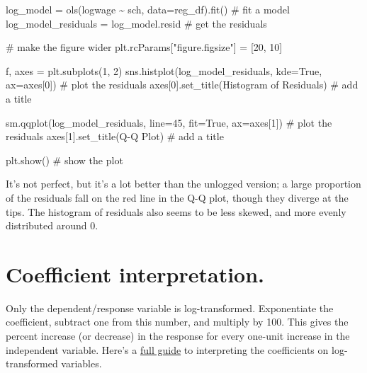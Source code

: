 \documentclass[
  letterpaper,
  DIV=11,
  numbers=noendperiod]{scrreprt}
\newenvironment{Shaded}{\begin{snugshade}}{\end{snugshade}}
\newcommand{\CommentTok}[1]{\textcolor[rgb]{0.37,0.37,0.37}{#1}}
\newcommand{\DecValTok}[1]{\textcolor[rgb]{0.68,0.00,0.00}{#1}}
\newcommand{\NormalTok}[1]{\textcolor[rgb]{0.00,0.23,0.31}{#1}}
\newcommand{\OperatorTok}[1]{\textcolor[rgb]{0.37,0.37,0.37}{#1}}
\newcommand{\StringTok}[1]{\textcolor[rgb]{0.13,0.47,0.30}{#1}}
\newcommand{\VariableTok}[1]{\textcolor[rgb]{0.07,0.07,0.07}{#1}}
\begin{document}
\begin{Shaded}
\begin{Highlighting}[]
\NormalTok{log\_model }\OperatorTok{=}\NormalTok{ ols(}\StringTok{\textquotesingle{}logwage \textasciitilde{}  sch\textquotesingle{}}\NormalTok{, data}\OperatorTok{=}\NormalTok{reg\_df).fit()  }\CommentTok{\# fit a model}
\NormalTok{log\_model\_residuals }\OperatorTok{=}\NormalTok{ log\_model.resid }\CommentTok{\# get the residuals}

\CommentTok{\# make the figure wider}
\NormalTok{plt.rcParams[}\StringTok{"figure.figsize"}\NormalTok{] }\OperatorTok{=}\NormalTok{ [}\DecValTok{20}\NormalTok{, }\DecValTok{10}\NormalTok{]}

\NormalTok{f, axes }\OperatorTok{=}\NormalTok{ plt.subplots(}\DecValTok{1}\NormalTok{, }\DecValTok{2}\NormalTok{)}
\NormalTok{sns.histplot(log\_model\_residuals, kde}\OperatorTok{=}\VariableTok{True}\NormalTok{, ax}\OperatorTok{=}\NormalTok{axes[}\DecValTok{0}\NormalTok{]) }\CommentTok{\# plot the residuals}
\NormalTok{axes[}\DecValTok{0}\NormalTok{].set\_title(}\StringTok{\textquotesingle{}Histogram of Residuals\textquotesingle{}}\NormalTok{) }\CommentTok{\# add a title}

\NormalTok{sm.qqplot(log\_model\_residuals, line}\OperatorTok{=}\StringTok{\textquotesingle{}45\textquotesingle{}}\NormalTok{, fit}\OperatorTok{=}\VariableTok{True}\NormalTok{,  ax}\OperatorTok{=}\NormalTok{axes[}\DecValTok{1}\NormalTok{]) }\CommentTok{\# plot the residuals}
\NormalTok{axes[}\DecValTok{1}\NormalTok{].set\_title(}\StringTok{\textquotesingle{}Q{-}Q Plot\textquotesingle{}}\NormalTok{) }\CommentTok{\# add a title}

\NormalTok{plt.show() }\CommentTok{\# show the plot}
\end{Highlighting}
\end{Shaded}

It's not perfect, but it's a lot better than the unlogged version; a
large proportion of the residuals fall on the red line in the Q-Q plot,
though they diverge at the tips. The histogram of residuals also seems
to be less skewed, and more evenly distributed around 0.

\hypertarget{coefficient-interpretation.}{%
\section{Coefficient
interpretation.}\label{coefficient-interpretation.}}

Only the dependent/response variable is log-transformed. Exponentiate
the coefficient, subtract one from this number, and multiply by 100.
This gives the percent increase (or decrease) in the response for every
one-unit increase in the independent variable. Here's a
\href{https://data.library.virginia.edu/interpreting-log-transformations-in-a-linear-model/\#:~:text=Interpret\%20the\%20coefficient\%20as\%20the,variable\%20increases\%20by\%20about\%200.20\%25.}{full
guide} to interpreting the coefficients on log-transformed variables.
\end{document}
